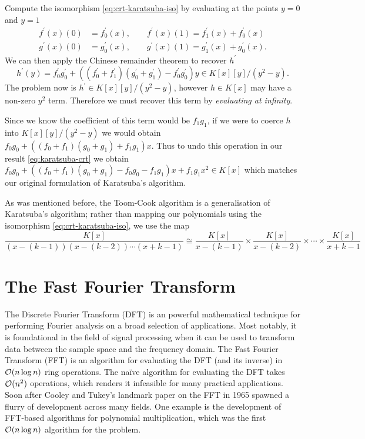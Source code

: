 Compute the isomorphism \eqref{eq:crt-karatsuba-iso} by evaluating at the points $y = 0$ and $y = 1$
\begin{align*}
    f^\prime(x)(0) &= f^\prime_0(x), \qquad f^\prime(x)(1) = f^\prime_1(x) + f^\prime_0(x)\\
    g^\prime(x)(0) &= g^\prime_0(x), \qquad g^\prime(x)(1) = g^\prime_1(x) + g^\prime_0(x).
\end{align*}
We can then apply the Chinese remainder theorem to recover $h^\prime$
\begin{equation}\label{eq:karatsuba-crt}
    h^\prime(y) = f^\prime_0g^\prime_0 + ((f^\prime_0 + f^\prime_1)(g^\prime_0 + g^\prime_1) - f^\prime_0g^\prime_0)y \in K[x][y]/(y^2 - y).
\end{equation}
The problem now is $h^\prime \in K[x][y]/(y^2 - y)$, however $h \in K[x]$ may have a non-zero $y^2$ term. Therefore we must recover this term by \emph{evaluating at infinity}. 

Since we know the coefficient of this term would be $f_1g_1$, if we were to coerce $h$ into $K[x][y]/(y^2 - y)$ we would obtain $f_0g_0 + ((f_0 + f_1)(g_0 + g_1) + f_1g_1)x$. Thus to undo this operation in our result \eqref{eq:karatsuba-crt} we obtain $f_0g_0 + ((f_0 + f_1)(g_0 + g_1) - f_0g_0 - f_1g_1)x + f_1g_1x^2 \in K[x]$ which matches our original formulation of Karatsuba's algorithm.

As was mentioned before, the Toom-Cook algorithm is a generalisation of Karatsuba's algorithm; rather than mapping our polynomials using the isomorphism \eqref{eq:crt-karatsuba-iso}, we use the map\cite{summary-poly-mult}
\[
    \frac{K[x]}{(x - (k - 1))(x - (k - 2))\cdots (x + k - 1)} \cong \frac{K[x]}{x - (k - 1)} \times \frac{K[x]}{x - (k - 2)} \times \cdots \times \frac{K[x]}{x + k - 1}
\]

\section{The Fast Fourier Transform}


The Discrete Fourier Transform (DFT) is an powerful mathematical technique for performing Fourier analysis on a broad selection of applications. Most notably, it is foundational in the field of signal processing when it can be used to transform data between the sample space and the frequency domain. The Fast Fourier Transform (FFT) is an algorithm for evaluating the DFT (and its inverse) in $\mathcal O(n \log n)$ ring operations. The na\"{i}ve algorithm for evaluating the DFT takes $\mathcal O(n^2)$ operations, which renders it infeasible for many practical applications. Soon after Cooley and Tukey's landmark paper on the FFT in 1965\cite{fft} spawned a flurry of development across many fields. One example is the development of FFT-based algorithms for polynomial multiplication, which was the first $\mathcal O(n \log n)$ algorithm for the problem.


